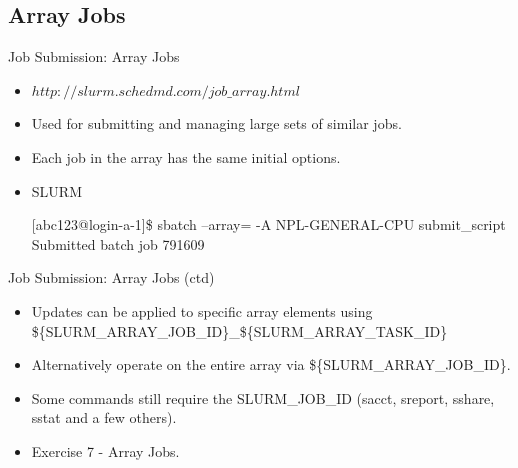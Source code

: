 \subsection{Array Jobs}
\begin{frame}[fragile]{Job Submission: Array Jobs}
\begin{itemize}
\item{\alert{$http://slurm.schedmd.com/job\_array.html$}}
\item{Used for submitting and managing large sets of similar jobs.}
\item{Each job in the array has the same \alert{initial} options.}
\item{SLURM}
\begin{semiverbatim}
\scriptsize
[abc123@login-a-1]\$ sbatch --array= -A NPL-GENERAL-CPU submit\_script
Submitted batch job {\color[rgb]{0,0.6,0}791609}
\tiny
{}
\end{semiverbatim}
\smallskip
{}
\smallskip
{}
\end{itemize}
\end{frame}

\begin{frame}[fragile]{Job Submission: Array Jobs (ctd)}
\begin{itemize}
\item{Updates can be applied to specific array elements using \$\{{\color[rgb]{0,0.6,0}SLURM\_ARRAY\_JOB\_ID}\}\_\$\{{\color{red}SLURM\_ARRAY\_TASK\_ID}\}}
\item{Alternatively operate on the entire array via \$\{{\color[rgb]{0,0.6,0}SLURM\_ARRAY\_JOB\_ID}\}}.
\item{Some commands still require the SLURM\_JOB\_ID (sacct, sreport, sshare, sstat and a few others).}
\pause
\item{Exercise 7 - Array Jobs.}
\end{itemize}
\end{frame}

